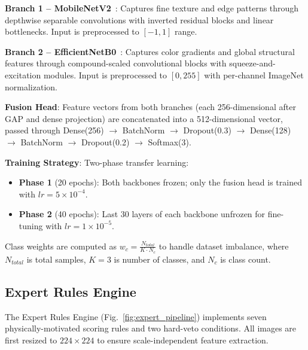 \documentclass[conference]{IEEEtran}
\begin{document}
\textbf{Branch 1 -- MobileNetV2}~\cite{ref21}: Captures fine texture and edge patterns through depthwise separable convolutions with inverted residual blocks and linear bottlenecks. Input is preprocessed to $[-1, 1]$ range.

\textbf{Branch 2 -- EfficientNetB0}~\cite{ref22}: Captures color gradients and global structural features through compound-scaled convolutional blocks with squeeze-and-excitation modules. Input is preprocessed to $[0, 255]$ with per-channel ImageNet normalization.

\textbf{Fusion Head}: Feature vectors from both branches (each 256-dimensional after GAP and dense projection) are concatenated into a 512-dimensional vector, passed through Dense(256) $\to$ BatchNorm $\to$ Dropout(0.3) $\to$ Dense(128) $\to$ BatchNorm $\to$ Dropout(0.2) $\to$ Softmax(3).

\textbf{Training Strategy}: Two-phase transfer learning:
\begin{itemize}[leftmargin=*]
    \item \textbf{Phase 1} (20 epochs): Both backbones frozen; only the fusion head is trained with $lr = 5 \times 10^{-4}$.
    \item \textbf{Phase 2} (40 epochs): Last 30 layers of each backbone unfrozen for fine-tuning with $lr = 1 \times 10^{-5}$.
\end{itemize}

Class weights are computed as $w_c = \frac{N_{total}}{K \cdot N_c}$ to handle dataset imbalance, where $N_{total}$ is total samples, $K=3$ is number of classes, and $N_c$ is class count.

\subsection{Expert Rules Engine}

The Expert Rules Engine (Fig.~\ref{fig:expert_pipeline}) implements seven physically-motivated scoring rules and two hard-veto conditions. All images are first resized to $224 \times 224$ to ensure scale-independent feature extraction.
\end{document}
